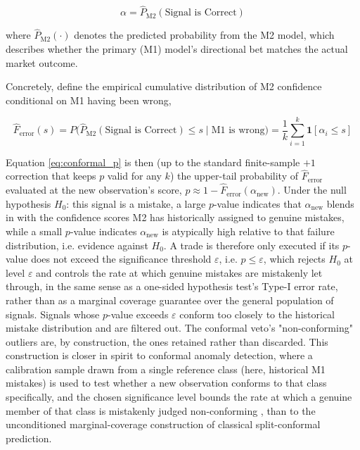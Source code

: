 \documentclass[12pt, a4paper]{article}
\begin{document}
\begin{equation}
\alpha = \hat{P}_{\text{M2}}(\text{Signal is Correct})
\label{eq:nonconformity}
\end{equation}

where \( \hat{P}_{\text{M2}}(\cdot) \) denotes the predicted probability from the M2 model, 
which describes whether the primary (M1) model's directional bet matches the actual market outcome.

Concretely, define the empirical cumulative distribution of M2 confidence conditional on M1 having been wrong,

\begin{equation}
\hat{F}_{\text{error}}(s) = P\big(\hat{P}_{\text{M2}}(\text{Signal is Correct}) \leq s \;\big|\; \text{M1 is wrong}\big) 
= \frac{1}{k}\sum_{i=1}^{k} \mathbf{1}[\alpha_i \leq s]
\end{equation}

Equation \ref{eq:conformal_p} is then (up to the standard finite-sample $+1$ correction that keeps $p$ valid for any $k$) the 
upper-tail probability of $\hat{F}_{\text{error}}$ evaluated at the new observation's score, $p \approx 1 - \hat{F}_{\text{error}}(\alpha_{\text{new}})$. 
Under the null hypothesis $H_0$: this signal is a mistake, a large $p$-value indicates that $\alpha_{\text{new}}$ blends in with the confidence 
scores M2 has historically assigned to genuine mistakes, while a small $p$-value indicates $\alpha_{\text{new}}$ is atypically high relative to that 
failure distribution, i.e. evidence against $H_0$. A trade is therefore only executed if its $p$-value does not exceed 
the significance threshold $\varepsilon$, i.e. $p \leq \varepsilon$, which rejects $H_0$ at level $\varepsilon$ and controls the rate at which genuine 
mistakes are mistakenly let through, in the same sense as a one-sided hypothesis test's Type-I error rate, rather than as a marginal 
coverage guarantee over the general population of signals. Signals whose $p$-value exceeds $\varepsilon$ conform too closely to the historical 
mistake distribution and are filtered out. The conformal veto's "non-conforming" outliers are, by construction, the ones retained rather 
than discarded. This construction is closer in spirit to conformal anomaly detection, where a calibration sample drawn from a single reference 
class (here, historical M1 mistakes) is used to test whether a new observation conforms to that class specifically, and the chosen 
significance level bounds the rate at which a genuine member of that class is mistakenly judged non-conforming \parencite{laxhammar_inductive_2015}, 
than to the unconditioned marginal-coverage construction of classical split-conformal prediction.
\end{document}

